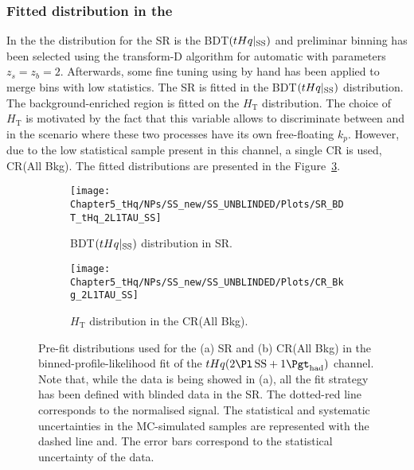 \subsubsection{Fitted distribution in the \dilepSStau}
\label{sec:ChaptH:Fit:Distributions:SS}
In the \dilepSStau the distribution for the SR is the BDT$(tHq|_{\text{SS}})$ and preliminar binning has
been selected using the transform-D algorithm for automatic with parameters $z_{s} = z_{b} = 2$. 
Afterwards, some fine tuning using by hand has been applied to merge bins with low statistics. 
The SR is fitted in the BDT$(tHq|_{\text{SS}})$ distribution. The background-enriched region
is fitted on the $H_{\text{T}}$ distribution. The choice of $H_{\text{T}}$ is motivated by the fact that
this variable allows to discriminate between \ttbar and \ttX in the scenario where these two
processes have its own free-floating $k_p$.  However, due to the low statistical sample present
in this channel, a single CR is used, CR(All Bkg).  The fitted distributions are presented in
the Figure~\ref{fig:ChaptH:PreFit:SS:SR_CR}.

\begin{figure}[h]
\centering
\begin{subfigure}{.5\textwidth}
  \centering
  \texttt{[image: Chapter5\_tHq/NPs/SS\_new/SS\_UNBLINDED/Plots/SR\_BDT\_tHq\_2L1TAU\_SS]}
  \caption{BDT$(tHq|_{\text{SS}})$ distribution in SR.}
  \label{fig:ChaptH:PreFit:SS:SR}
\end{subfigure}%
\hfill
\begin{subfigure}{.5\textwidth}
  \centering
  \texttt{[image: Chapter5\_tHq/NPs/SS\_new/SS\_UNBLINDED/Plots/CR\_Bkg\_2L1TAU\_SS]}
  \caption{$H_{\text{T}}$ distribution in the CR(All Bkg).}
  \label{fig:ChaptH:PreFit:SS:CR}
\end{subfigure}%
\caption{Pre-fit distributions used for the (a) \tHq SR and (b) CR(All Bkg) in the
binned-profile-likelihood fit of the $\tHq(\dilepSStau)$ channel.
Note that, while the data is being showed in (a), all the fit strategy has been defined with blinded data in the SR.
The dotted-red line corresponds to the normalised \tHq signal.
The statistical and systematic uncertainties in the MC-simulated samples are represented with the dashed line
and. The error bars correspond to the statistical uncertainty of the data.}
\label{fig:ChaptH:PreFit:SS:SR_CR}
\end{figure}




